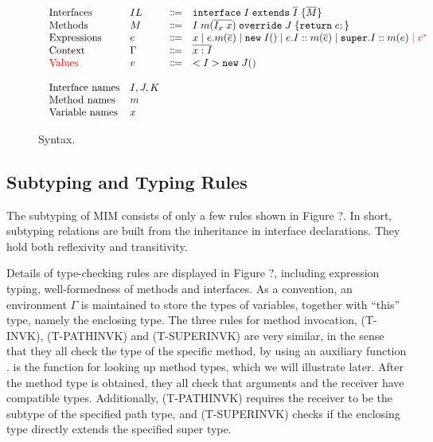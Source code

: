 \begin{figure*}[htbp]
\begin{displaymath}
\begin{array}{l}
\begin{array}{llrl}
\text{Interfaces}   & IL & \Coloneqq & \texttt{interface} \; I \; \texttt{extends} \; \overline{I} \; {\{} \overline{M} {\}} \\
\text{Methods}      & M  & \Coloneqq & I \; m (\overline{I_x \; x}) \; \texttt{override} \; J \; {\{} \texttt{return} \; e ; {\}} \\
\text{Expressions}  & e  & \Coloneqq & x \mid
e.m(\overline{e}) \mid
\texttt{new} \; I() \mid
e.I::m(\overline{e}) \mid
\texttt{super}.I::m(e) \; \textcolor{red}{\mid} \; \textcolor{red}{v^*} \\
\text{Context}      & \Gamma & \Coloneqq & \overline{x:I} \\
\text{\textcolor{red}{Values}}       & v & \Coloneqq & <I>\texttt{new} \; J() \\
\\
\text{Interface names} & I, J, K & & \\
\text{Method names} & m & & \\
\text{Variable names} & x & &
\end{array}
\end{array}
\end{displaymath}
\caption{Syntax. }\label{fig:syntax}
\end{figure*}

\subsection{Subtyping and Typing Rules}
The subtyping of MIM consists of only a few rules shown in Figure ?.
In short, subtyping relations are built from the inheritance in interface
declarations. They hold both reflexivity and transitivity.

Details of type-checking rules are displayed in Figure ?, including expression
typing, well-formedness of methods and interfaces. As a convention, an environment
$\Gamma$ is maintained to store the types of variables, together with ``this'' type, namely
the enclosing type. The three rules for method invocation, (T-INVK), (T-PATHINVK) and (T-SUPERINVK)
are very similar, in the sense that they all check the type of the specific method, by using
an auxiliary function \mtype. \mtype is the function for looking up method types, which we will
illustrate later. After the method type is obtained, they all check that arguments and the receiver
have compatible types. Additionally, (T-PATHINVK) requires the receiver to be the subtype of the specified
path type, and (T-SUPERINVK) checks if the enclosing type directly extends the specified super type.

